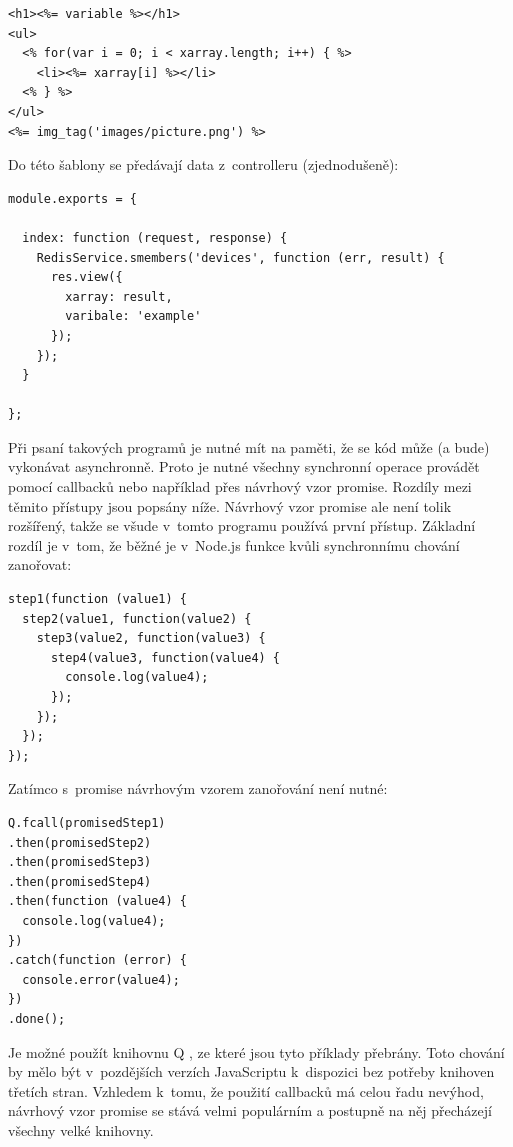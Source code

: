 \begin{verbatim}
<h1><%= variable %></h1>
<ul>
  <% for(var i = 0; i < xarray.length; i++) { %>
    <li><%= xarray[i] %></li>
  <% } %>
</ul>
<%= img_tag('images/picture.png') %>
\end{verbatim}

Do této šablony se předávají data z~controlleru (zjednodušeně):

\begin{verbatim}
module.exports = {

  index: function (request, response) {
    RedisService.smembers('devices', function (err, result) {
      res.view({
        xarray: result,
        varibale: 'example'
      });
    });
  }

};
\end{verbatim}

Při psaní takových programů je nutné mít na paměti, že se kód může (a bude) vykonávat asynchronně. Proto je nutné všechny synchronní operace provádět pomocí callbacků nebo například přes návrhový vzor promise.  Rozdíly mezi těmito přístupy jsou popsány níže. Návrhový vzor promise ale není tolik rozšířený, takže se všude v~tomto programu používá první přístup. Základní rozdíl je v~tom, že běžné je v~Node.js funkce kvůli synchronnímu chování zanořovat:

\begin{verbatim}
step1(function (value1) {
  step2(value1, function(value2) {
    step3(value2, function(value3) {
      step4(value3, function(value4) {
        console.log(value4);
      });
    });
  });
});
\end{verbatim}

Zatímco s~promise návrhovým vzorem zanořování není nutné:

\begin{verbatim}
Q.fcall(promisedStep1)
.then(promisedStep2)
.then(promisedStep3)
.then(promisedStep4)
.then(function (value4) {
  console.log(value4);
})
.catch(function (error) {
  console.error(value4);
})
.done();
\end{verbatim}

Je možné použít knihovnu Q \cite{q}, ze které jsou tyto příklady přebrány. Toto chování by mělo být v~pozdějších verzích JavaScriptu k~dispozici bez potřeby knihoven třetích stran. Vzhledem k~tomu, že použití callbacků má celou řadu nevýhod, návrhový vzor promise se stává velmi populárním a postupně na něj přecházejí všechny velké knihovny.

